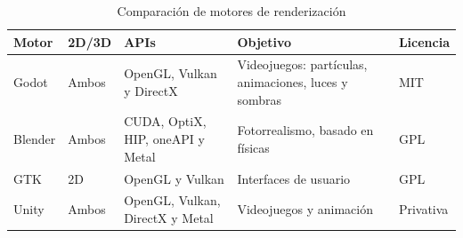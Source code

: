 \begin{table}[htp]
\centering


    
    \begin{tabular}{ | p{2cm} | p{2cm} | p{3cm} | p{3cm} | p{2cm} | }
        

        \hline
        \textbf{Motor} & \textbf{2D/3D} & \textbf{APIs} & \textbf{Objetivo} & \textbf{Licencia}\\
        \hline
        
        Godot & Ambos & OpenGL, Vulkan y DirectX & Videojuegos: partículas, animaciones, luces y sombras  & MIT\\
        \hline
        Blender & Ambos & CUDA, OptiX, HIP, oneAPI y Metal  & Fotorrealismo, basado en físicas  & GPL\\
        \hline
        GTK & 2D & OpenGL y Vulkan & Interfaces de usuario & GPL\\
        \hline
        Unity & Ambos & OpenGL, Vulkan, DirectX y Metal & Videojuegos y animación  & Privativa\\
        \hline
        
    \end{tabular} 
    
    \caption{Comparación de motores de renderización}
    \label{tbl:comparison-engine} 
\end{table}